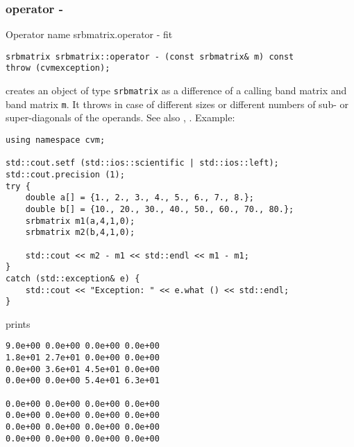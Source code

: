\subsubsection{operator -}
Operator%
\pdfdest name {srbmatrix.operator -} fit
\begin{verbatim}
srbmatrix srbmatrix::operator - (const srbmatrix& m) const
throw (cvmexception);
\end{verbatim}
creates an object of type \verb"srbmatrix" as a difference of
a calling band matrix and  band matrix \verb"m".
It throws  
in case of different sizes or different numbers of sub- or super-diagonals
of the operands.
See also , .
Example:
\begin{Verbatim}
using namespace cvm;

std::cout.setf (std::ios::scientific | std::ios::left); 
std::cout.precision (1);
try {
    double a[] = {1., 2., 3., 4., 5., 6., 7., 8.};
    double b[] = {10., 20., 30., 40., 50., 60., 70., 80.};
    srbmatrix m1(a,4,1,0);
    srbmatrix m2(b,4,1,0);

    std::cout << m2 - m1 << std::endl << m1 - m1;
}
catch (std::exception& e) {
    std::cout << "Exception: " << e.what () << std::endl;
}
\end{Verbatim}
prints
\begin{Verbatim}
9.0e+00 0.0e+00 0.0e+00 0.0e+00
1.8e+01 2.7e+01 0.0e+00 0.0e+00
0.0e+00 3.6e+01 4.5e+01 0.0e+00
0.0e+00 0.0e+00 5.4e+01 6.3e+01

0.0e+00 0.0e+00 0.0e+00 0.0e+00
0.0e+00 0.0e+00 0.0e+00 0.0e+00
0.0e+00 0.0e+00 0.0e+00 0.0e+00
0.0e+00 0.0e+00 0.0e+00 0.0e+00
\end{Verbatim}
\newpage





